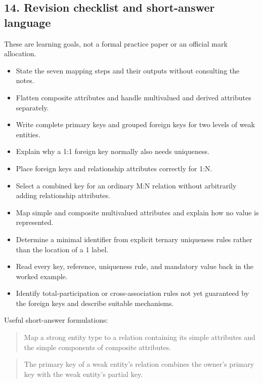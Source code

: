 \subsection{14. Revision checklist and short-answer language}\label{04_er_to_relational_mapping_en-revision-checklist-and-short-answer-language}

These are learning goals, not a formal practice paper or an official mark allocation.

\begin{itemize}
\tightlist
\item[$\square$]
  State the seven mapping steps and their outputs without consulting the notes.
\item[$\square$]
  Flatten composite attributes and handle multivalued and derived attributes separately.
\item[$\square$]
  Write complete primary keys and grouped foreign keys for two levels of weak entities.
\item[$\square$]
  Explain why a 1:1 foreign key normally also needs uniqueness.
\item[$\square$]
  Place foreign keys and relationship attributes correctly for 1:N.
\item[$\square$]
  Select a combined key for an ordinary M:N relation without arbitrarily adding relationship attributes.
\item[$\square$]
  Map simple and composite multivalued attributes and explain how no value is represented.
\item[$\square$]
  Determine a minimal identifier from explicit ternary uniqueness rules rather than the location of a 1 label.
\item[$\square$]
  Read every key, reference, uniqueness rule, and mandatory value back in the worked example.
\item[$\square$]
  Identify total-participation or cross-association rules not yet guaranteed by the foreign keys and describe suitable mechanisms.
\end{itemize}

Useful short-answer formulations:

\begin{quote}
Map a strong entity type to a relation containing its simple attributes and the simple components of composite attributes.
\end{quote}

\begin{quote}
The primary key of a weak entity's relation combines the owner's primary key with the weak entity's partial key.
\end{quote}

